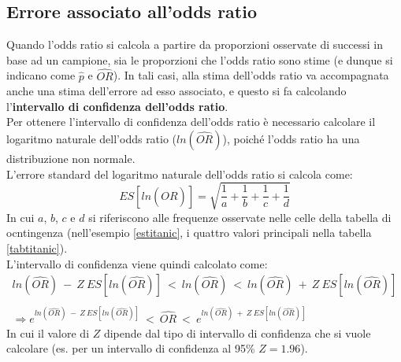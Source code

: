 \documentclass[drafts, 10pt]{book}
\begin{document}
\subsection{Errore associato all'odds ratio}
Quando l'odds ratio si calcola a partire da proporzioni osservate di successi in base ad un campione, sia le proporzioni che l'odds ratio sono stime (e dunque si indicano come $\hat{p}$ e $\hat{OR}$). In tali casi, alla stima dell'odds ratio va accompagnata anche una stima dell'errore ad esso associato, e questo si fa calcolando l'\textbf{intervallo di confidenza dell'odds ratio}.
\\
Per ottenere l'intervallo di confidenza dell'odds ratio è necessario calcolare il logaritmo naturale dell'odds ratio ($ln(\hat{OR})$), poiché l'odds ratio ha una distribuzione non normale.
\\
L'errore standard del logaritmo naturale dell'odds ratio si calcola come:
\begin{equation}
ES[ln(\hat{OR})] = \sqrt{\frac{1}{a}+\frac{1}{b}+\frac{1}{c}+\frac{1}{d}}
\end{equation}
In cui $a$, $b$, $c$ e $d$ si riferiscono alle frequenze osservate nelle celle della tabella di ocntingenza (nell'esempio \ref{estitanic}, i quattro valori principali nella tabella \ref{tabtitanic}).
\\
L'intervallo di confidenza viene quindi calcolato come:
\begin{align*}
    ln(\hat{OR})\ -\ Z\ ES[ln(\hat{OR})]\ <\ ln(\hat{OR})\ <\ ln(\hat{OR})\ +\ Z\ ES[ln(\hat{OR})]
    \\ \\
    \Rightarrow e^{ln(\hat{OR})\ -\ Z\ ES[ln(\hat{OR})]}\ <\ \hat{OR}\ <\ e^{ln(\hat{OR})\ +\ Z\ ES[ln(\hat{OR})]}
\end{align*}
In cui il valore di $Z$ dipende dal tipo di intervallo di confidenza che si vuole calcolare (es. per un intervallo di confidenza al 95\% $Z = 1.96$).
\\
\end{document}
